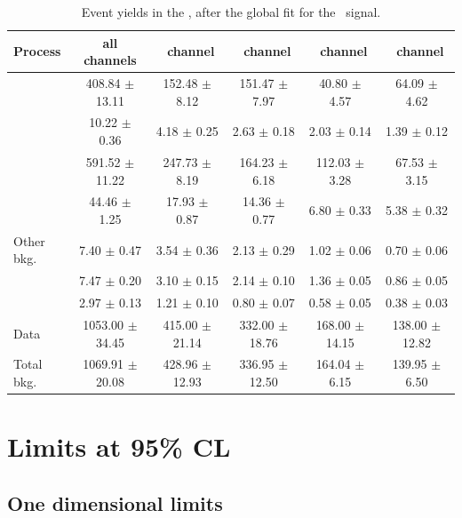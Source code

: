 \begin{landscape}
	\vspace*{\fill}
	\begin{table}[htbp]
		\centering
		\caption{Event yields  in the \WZCR, after the global fit for the \Zut\ signal.  }	
		\begin{tabular} {l c c c c c  }
			\toprule
			Process & all channels & \mumumu\ channel & \emumu\ channel & \eemu\ channel &\eee\ channel \\
			\midrule
			\NPL\ \DY  & 408.84 $ \pm $ 13.11 & 152.48 $\pm$ 8.12 &151.47 $\pm$ 7.97 & 40.80 $\pm$ 4.57 & 64.09 $\pm$ 4.62 \\ 
			\ttZ    	& 10.22 $ \pm $ 0.36  &  4.18 $\pm$  0.25 &  2.63 $\pm$ 0.18 &   2.03 $\pm$ 0.14 &  1.39 $\pm$ 0.12 \\ 
			\WZ 		& 591.52 $ \pm $ 11.22& 247.73 $\pm$ 8.19 &164.23 $\pm$ 6.18 & 112.03 $\pm$ 3.28 & 67.53 $\pm$ 3.15 \\ 
			\ZZ 		& 44.46 $ \pm $ 1.25  & 17.93 $\pm$  0.87 &14.36  $\pm$ 0.77 &   6.80 $\pm$ 0.33 & 5.38 $\pm$ 0.32 \\ 
			Other bkg. 	& 7.40 $ \pm $ 0.47   &  3.54 $\pm$  0.36 &  2.13 $\pm$ 0.29 &   1.02 $\pm$ 0.06 & 0.70 $\pm$ 0.06 \\ 
			\tZq 		& 7.47 $ \pm $ 0.20   &  3.10 $\pm$  0.15 &  2.14 $\pm$ 0.10 &   1.36 $\pm$ 0.05 & 0.86  $\pm$ 0.05 \B \\ 
			\hdashline 
			\kZut  		& 2.97 $ \pm $ 0.13   &  1.21 $\pm$  0.10 & 0.80 $\pm$ 0.07 &   0.58 $\pm$ 0.05 & 0.38 $\pm$ 0.03 \T\B\\
			\hdashline
			Data        & 1053.00 $ \pm $ 34.45 & 415.00 $\pm$ 21.14 & 332.00 $\pm$ 18.76 & 168.00 $\pm$ 14.15 & 138.00 $\pm$ 12.82 \T \\
			Total bkg.  & 1069.91 $ \pm $ 20.08 & 428.96 $\pm$ 12.93 & 336.95 $\pm$ 12.50 & 164.04 $\pm$ 6.15 & 139.95 $\pm$ 6.50 \\
			\bottomrule
		\end{tabular}
		\label{tab:PYieldWZCR}
	\end{table}
	\vspace*{\fill}
\end{landscape}
\newpage
\section{Limits at 95\% CL}
\label{sec:limits}
\subsection{One dimensional limits}

